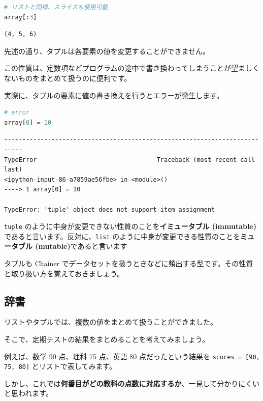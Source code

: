 \begin{lstlisting}[style=codecell,language=Python]
# リストと同様、スライスも使用可能
array[:3]
\end{lstlisting}

\begin{lstlisting}[style=outputcell]
(4, 5, 6)
\end{lstlisting}

先述の通り、タプルは各要素の値を変更することができません。

この性質は、定数項などプログラムの途中で書き換わってしまうことが望ましくないものをまとめて扱うのに便利です。


実際に、タプルの要素に値の書き換えを行うとエラーが発生します。


\begin{lstlisting}[style=codecell,language=Python]
# error
array[0] = 10
\end{lstlisting}

\begin{lstlisting}[style=outputcell]
---------------------------------------------------------------------------
TypeError                                 Traceback (most recent call last)
<ipython-input-86-a7859ae56fbe> in <module>()
----> 1 array[0] = 10

TypeError: 'tuple' object does not support item assignment
\end{lstlisting}

\texttt{tuple} のように中身が変更できない性質のことを\textbf{イミュータブル (immutable)}であると言います。反対に、\texttt{list} のように中身が変更できる性質のことを\textbf{ミュータブル (mutable)}であると言います


タプルも Chainer でデータセットを扱うときなどに頻出する型です。その性質と取り扱い方を覚えておきましょう。


\subsection{辞書}


リストやタプルでは、複数の値をまとめて扱うことができました。

そこで、定期テストの結果をまとめることを考えてみましょう。


例えば、数学 90 点、理科 75 点、英語 80 点だったという結果を \texttt{scores = [90, 75, 80]} とリストで表してみます。

しかし、これでは\textbf{何番目がどの教科の点数に対応するか}、一見して分かりにくいと思われます。


